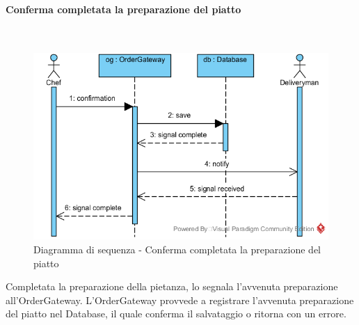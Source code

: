 \subsubsection{\Chef{}}

\begin{samepage}
\paragraph{Conferma completata la preparazione del piatto}\mbox{}\\
\end{samepage}
\begin{figure}[H]
	\centering
	\includegraphics[width=14cm]{diagrammi_img/sequenza/cuoco_piatto_pronto.png}
	\caption{Diagramma di sequenza - Conferma completata la preparazione del piatto}
\end{figure}
Completata la preparazione della pietanza, lo \Chef{} segnala l'avvenuta preparazione all'Order\-Gateway. L'Order\-Gateway provvede a registrare l'avvenuta preparazione del piatto nel Database, il quale conferma il salvataggio o ritorna con un errore.

\subsubsection{\Chef{}}

